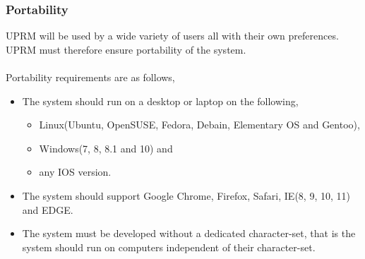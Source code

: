 \subsubsection{Portability}
	UPRM will be used by a wide variety of users all with their own preferences. UPRM must therefore ensure portability of the system.\\ \\
	Portability requirements are as follows,
	\begin{itemize}
		\item The system should run on a desktop or laptop on the following,
			\begin{itemize}
				\item Linux(Ubuntu, OpenSUSE, Fedora, Debain, Elementary OS and Gentoo),
				\item Windows(7, 8, 8.1 and 10) and
				\item any IOS version.
			\end{itemize}
		\item The system should support Google Chrome, Firefox, Safari, IE(8, 9, 10, 11) and EDGE.
		\item  The system must be developed without a dedicated character-set, that is the system should run on computers independent of their character-set.
	\end{itemize}